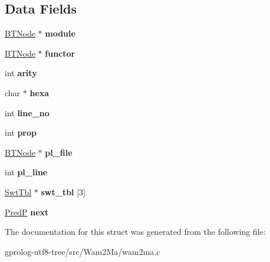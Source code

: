 \subsection*{Data Fields}
\begin{DoxyCompactItemize}
\item 
\hyperlink{structbtnode}{B\+T\+Node} $\ast$ {\bfseries module}\hypertarget{structpredinf_a5f44f90f1226e1463e76665aaf490a9d}{}\label{structpredinf_a5f44f90f1226e1463e76665aaf490a9d}

\item 
\hyperlink{structbtnode}{B\+T\+Node} $\ast$ {\bfseries functor}\hypertarget{structpredinf_a6ae4c5cbb30b0db0b0dde51084453eee}{}\label{structpredinf_a6ae4c5cbb30b0db0b0dde51084453eee}

\item 
int {\bfseries arity}\hypertarget{structpredinf_a16871c2b0c2e29058abe513301f0b7b0}{}\label{structpredinf_a16871c2b0c2e29058abe513301f0b7b0}

\item 
char $\ast$ {\bfseries hexa}\hypertarget{structpredinf_ab6fc21ba8f80aea382dfd11b9a50e7ac}{}\label{structpredinf_ab6fc21ba8f80aea382dfd11b9a50e7ac}

\item 
int {\bfseries line\+\_\+no}\hypertarget{structpredinf_ae858dcfb66886799f41d0042ccf8667e}{}\label{structpredinf_ae858dcfb66886799f41d0042ccf8667e}

\item 
int {\bfseries prop}\hypertarget{structpredinf_a39785936db83e7bcf5036b5365423c5e}{}\label{structpredinf_a39785936db83e7bcf5036b5365423c5e}

\item 
\hyperlink{structbtnode}{B\+T\+Node} $\ast$ {\bfseries pl\+\_\+file}\hypertarget{structpredinf_a85bb945f5415fd2177b55ce91562c36c}{}\label{structpredinf_a85bb945f5415fd2177b55ce91562c36c}

\item 
int {\bfseries pl\+\_\+line}\hypertarget{structpredinf_a0bb58f984add8b6a8e040181a8181cbd}{}\label{structpredinf_a0bb58f984add8b6a8e040181a8181cbd}

\item 
\hyperlink{structSwtInf}{Swt\+Tbl} $\ast$ {\bfseries swt\+\_\+tbl} \mbox{[}3\mbox{]}\hypertarget{structpredinf_a9e448a6b5c08b225ac0a07043f3a37c9}{}\label{structpredinf_a9e448a6b5c08b225ac0a07043f3a37c9}

\item 
\hyperlink{structpredinf}{PredP} {\bfseries next}\hypertarget{structpredinf_a5640b4a5b40d6208119e14349a52d8db}{}\label{structpredinf_a5640b4a5b40d6208119e14349a52d8db}

\end{DoxyCompactItemize}


The documentation for this struct was generated from the following file\+:\begin{DoxyCompactItemize}
\item 
gprolog-\/utf8-\/tree/src/\+Wam2\+Ma/wam2ma.\+c\end{DoxyCompactItemize}
